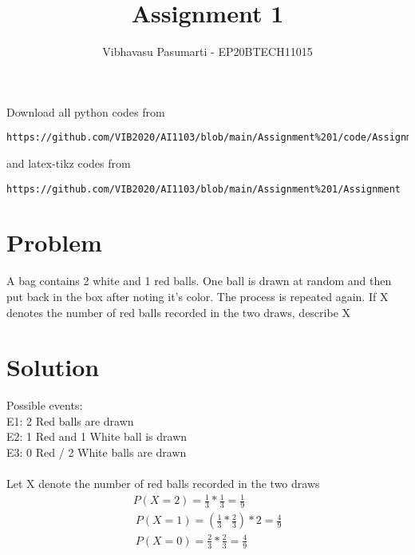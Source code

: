 \documentclass[journal,12pt,twocolumn]{IEEEtran}
\begin{document}
\title{Assignment 1}
\author{Vibhavasu Pasumarti - EP20BTECH11015}
\maketitle
\newpage
\bigskip
\renewcommand{\thefigure}{\theenumi}
\renewcommand{\thetable}{\theenumi}
Download all python codes from 
\begin{lstlisting}
https://github.com/VIB2020/AI1103/blob/main/Assignment%201/code/Assignment_1.py
\end{lstlisting}
%
and latex-tikz codes from 
%
\begin{lstlisting}
https://github.com/VIB2020/AI1103/blob/main/Assignment%201/Assignment
\end{lstlisting}
\section{Problem}
A bag contains 2 white and 1 red balls. One ball is 
drawn at random and then put back in the box after 
noting it's color. The process is repeated again. 
If X denotes the number of red balls recorded in the
two draws, describe X
\section{Solution}

Possible events:\\
E1: 2 Red balls are drawn\\
E2: 1 Red and 1 White ball is drawn\\
E3: 0 Red / 2 White balls are drawn\\\\
Let X denote the number of red balls recorded in 
the two draws\\
\begin{align}
P(X = 2) = \frac{1}{3} * \frac{1}{3} = \frac{1}{9}\\\
P(X = 1) = \left(\frac{1}{3} * \frac{2}{3}\right) * 2 = \frac{4}{9}\\\
P(X = 0) = \frac{2}{3} * \frac{2}{3} = \frac{4}{9}
\end{align}
\end{document}
